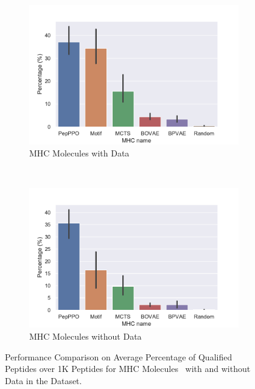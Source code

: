 \documentclass[letterpaper]{article}
\begin{document}
\begin{figure}[!h]
	\centering
	\begin{subfigure}[b]{.45\linewidth}
		\includegraphics[width=\linewidth]{plots/mhc_avgresult_with_data.pdf}
		\caption{MHC Molecules with Data}
		\label{fig:avg_result_with_data}
	\end{subfigure}
	~~
	\begin{subfigure}[b]{.45\linewidth}
		\includegraphics[width=\linewidth]{plots/mhc_avgresult_without_data.pdf}
		\caption{MHC Molecules without Data}
		\label{fig:avg_result_without_data}	
	\end{subfigure}
	\caption{Performance Comparison on Average Percentage of Qualified Peptides over 1K Peptides for MHC Molecules \
		with and without Data in the Dataset.}
\end{figure}

\end{document}
